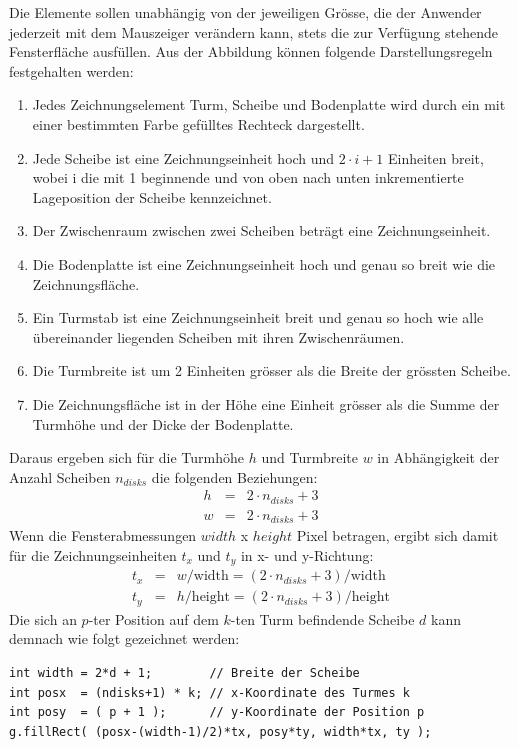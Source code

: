 Die Elemente sollen
unabhängig von der jeweiligen Grösse, die der Anwender jederzeit mit dem Mauszeiger
verändern kann, stets die zur Verfügung stehende Fensterfläche
ausfüllen. Aus der Abbildung
können folgende Darstellungsregeln festgehalten werden:
\begin{enumerate}
\item Jedes Zeichnungselement Turm, Scheibe und Bodenplatte wird durch ein mit einer
  bestimmten Farbe gefülltes Rechteck dargestellt.
\item Jede Scheibe ist eine Zeichnungseinheit hoch und $2\cdot i + 1$ Einheiten breit,
  wobei i die mit 1 beginnende und von oben nach unten inkrementierte Lageposition
  der Scheibe kennzeichnet. 
\item Der Zwischenraum zwischen zwei Scheiben beträgt eine Zeichnungseinheit.
\item Die Bodenplatte ist eine Zeichnungseinheit hoch und genau so breit wie
  die Zeichnungsfläche.
\item Ein Turmstab ist eine Zeichnungseinheit breit und genau so
 hoch wie alle übereinander
  liegenden Scheiben mit ihren Zwischenräumen.
\item Die Turmbreite ist um 2 Einheiten grösser als die Breite der grössten
  Scheibe. 
\item Die Zeichnungsfläche ist in der Höhe eine Einheit grösser als die Summe
  der Turmhöhe und der Dicke der Bodenplatte.
\end{enumerate}
Daraus ergeben sich für die Turmhöhe $h$ und Turmbreite $w$ 
in Abhängigkeit der Anzahl Scheiben $n_{disks}$
die folgenden Beziehungen:
\begin{eqnarray}
 h & = & 2\cdot n_{disks} + 3\\
 w & = & 2\cdot n_{disks} + 3
\end{eqnarray}
Wenn die Fensterabmessungen $width$ x $height$ Pixel betragen, ergibt sich damit für die
Zeichnungseinheiten $t_x$ und $t_y$ in x- und y-Richtung:
\begin{eqnarray}
t_x & = & w/\mbox{width} = \left(2\cdot n_{disks} + 3\right)/\mbox{width}\\
t_y & = & h/\mbox{height} = \left(2\cdot n_{disks} + 3\right)/\mbox{height}
\end{eqnarray}
\ifslides
\newpage
\fi
Die sich an $p$-ter Position auf dem $k$-ten Turm befindende Scheibe $d$ kann
demnach wie folgt gezeichnet werden:
\begin{lstlisting}
int width = 2*d + 1;        // Breite der Scheibe
int posx  = (ndisks+1) * k; // x-Koordinate des Turmes k
int posy  = ( p + 1 );      // y-Koordinate der Position p
g.fillRect( (posx-(width-1)/2)*tx, posy*ty, width*tx, ty );
\end{lstlisting} 
\newpage
